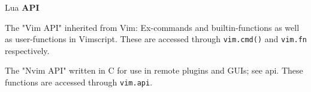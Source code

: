 \begin{frame}{Lua}
  \textbf{API}
    \begin{widedescription}
        \item The "Vim API" inherited from Vim: Ex-commands and builtin-functions as
          well as user-functions in Vimscript. These are accessed through \texttt{vim.cmd()}
          and \texttt{vim.fn} respectively.
        \item The "Nvim API" written in C for use in remote plugins and GUIs; see api.
          These functions are accessed through \texttt{vim.api}.
    \end{widedescription}
\end{frame}
